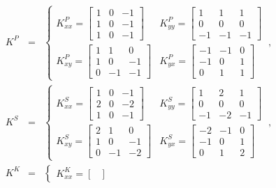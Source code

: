 \begin{enumerate}[leftmargin=*]
{\footnotesize
\begin{eqnarray}
K^{P} & = & \begin{cases}
K_{xx}^{P} = \begin{bmatrix}
	1 & 0 & -1 \\
	1 & 0 & -1 \\
	1 & 0 & -1
\end{bmatrix} & K_{yy}^{P} = \begin{bmatrix}
	1 & 1 & 1 \\
	0 & 0 & 0 \\
	-1 & -1 & -1
\end{bmatrix} \\
K_{xy}^{P} = \begin{bmatrix}
	1 & 1 & 0 \\
	1 & 0 & -1 \\
	0 & -1 & -1
\end{bmatrix} & K_{yx}^{P} = \begin{bmatrix}
	-1 & -1 & 0 \\
	-1 & 0 & 1 \\
	0 & 1 & 1
\end{bmatrix}
\end{cases} \ , \label{eq:prewitt} \\
K^{S} & = & \begin{cases}
K_{xx}^{S} = \begin{bmatrix}
	1 & 0 & -1 \\
	2 & 0 & -2 \\
	1 & 0 & -1
\end{bmatrix} & K_{yy}^{S} = \begin{bmatrix}
	1 & 2 & 1 \\
	0 & 0 & 0 \\
	-1 & -2 & -1
\end{bmatrix} \\
K_{xy}^{S} = \begin{bmatrix}
	2 & 1 & 0 \\
	1 & 0 & -1 \\
	0 & -1 & -2
\end{bmatrix} & K_{yx}^{S} = \begin{bmatrix}
	-2 & -1 & 0 \\
	-1 & 0 & 1 \\
	0 & 1 & 2
\end{bmatrix}
\end{cases} \ , \label{eq:sobel} \\
K^{K} & = & \begin{cases}
K_{xx}^{K} = \begin{bmatrix}

\end{bmatrix}
\end{cases}
\end{eqnarray}}
\end{enumerate}
